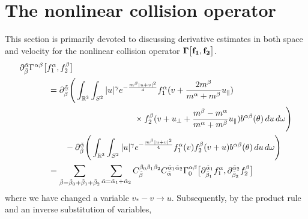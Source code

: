\documentclass[reqno]{amsart}
\numberwithin{equation}{section}
\numberwithin{equation}{section}
\begin{document}
	
	
	\section{The nonlinear collision operator}
	This section is primarily devoted to discussing derivative estimates in both space and velocity for the nonlinear collision operator $\bf{\Gamma}\big[f_1,f_2\big]$. 
	\begin{align*}
	&\partial_{\tilde{\beta}}^{\tilde{\alpha}} \Gamma^{\alpha \beta} \big[f^{\alpha}_1, f^{\beta}_2\big]\\
	 &\hspace{1.2cm}= 
		\partial_{\tilde{\beta}}^{\tilde{\alpha}} \Bigg( 
	\int_{\mathbb{R}^3} \int_{S^2} |u|^\gamma e^{-\frac{m^{\beta}|u+v|^2}{4}} 
	f^{\alpha}_1(v + \frac{2m^{\beta}}{m^{\alpha}+m^{\beta}}u_{\parallel}) \\
	&\hspace{4.8cm} \times f^{\beta}_2(v + u_\perp+\frac{m^{\beta}-m^{\alpha}}{m^{\alpha}+m^{\beta}}u_{\parallel}) b^{\alpha\beta}(\theta) \, du \, d\omega 
	\Bigg) \\
	&\hspace{1.9cm}- 	\partial_{\tilde{\beta}}^{\tilde{\alpha}} \Bigg( 
	\int_{\mathbb{R}^3} \int_{S^2} |u|^\gamma e^{-\frac{m^{\beta}|u+v|^2}{4}} 
	f^{\alpha}_1(v) f^{\beta}_2(v+u) b^{\alpha\beta}(\theta) \, du \, d\omega 
	\Bigg) \\
	&\hspace{1.2cm}= \sum_{\tilde{\beta}=\tilde{\beta}_0+\tilde{\beta}_1+\tilde{\beta}_2} 
	\sum_{\tilde{\alpha}=\tilde{\alpha}_1+\tilde{\alpha}_2} C_{\tilde{\beta}}^{\tilde{\beta}_0 \tilde{\beta}_1 \tilde{\beta}_2} C_{\tilde{\alpha}}^{\tilde{\alpha}_1 \tilde{\alpha}_2} 
	\Gamma^{\alpha \beta}_0 \big[\partial_{\tilde{\beta}_1}^{\tilde{\alpha}_1}f^{\alpha}_1, \partial_{\tilde{\beta}_2}^{\tilde{\alpha}_2}f^{\beta}_2\big]
	\end{align*}
	 where we have  changed a variable $v_*-v \rightarrow u$. Subsequently, by the product rule and an inverse substitution of variables,
\end{document}
